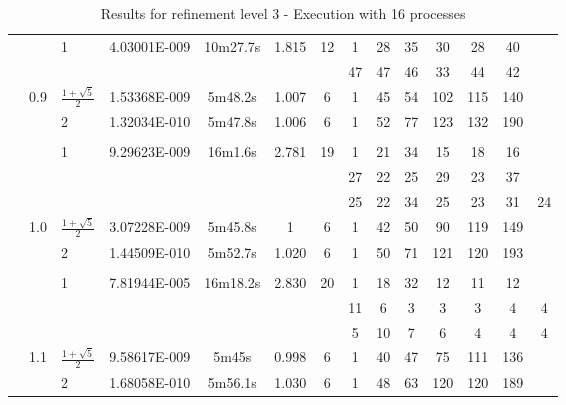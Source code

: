 \begin{sidewaystable}[p]
\begin{changemargin}{-2cm}{0cm}
\begin{tabular}{l c p{2cm} | c c c c c c c c c c c}
 \hline
 & & 1 & 4.03001E-009 & 10m27.7s & 1.815 & 12 & 1 & 28 & 35 & 30 & 28 & 40 \\
 & & & & & & & 47 & 47 & 46 & 33 & 44 & 42 \\
 & 0.9 & $ \frac{1 + \sqrt{5}}{2} $ & 
1.53368E-009 & 5m48.2s & 1.007 & 6 & 1 & 45 & 54 & 102 & 115 & 140 \\
 & & 2 & 1.32034E-010 & 5m47.8s & 1.006 & 6 & 1 & 52 & 77 & 123 & 132 & 190 \\
& & & & \\
 \hline
  & & 1 & 9.29623E-009 & 16m1.6s & 2.781 & 19 & 1 & 21 & 34 & 15 & 18 & 16 \\
  & & & & & & & 27 & 22 & 25 & 29 & 23 & 37 \\
  & & & & & & & 25 & 22 & 34 & 25 & 23 & 31 & 24 \\
& 1.0 & $ \frac{1 + \sqrt{5}}{2} $ &
3.07228E-009 & 5m45.8s & 1 & 6 & 1 & 42 & 50 & 90 & 119 & 149 \\
 & & 2 & 1.44509E-010 & 5m52.7s & 1.020 & 6 & 1 & 50 & 71 & 121 & 120 & 193 \\
& & & & \\
 \hline
  & & 1 & 7.81944E-005 & 16m18.2s & 2.830 & 20 & 1 & 18 & 32 & 12 & 11 & 12 \\
  & & & & & & & 11 & 6 & 3 & 3 & 3 & 4 & 4 \\
  & & & & & & & 5 & 10 & 7 & 6 & 4 & 4 & 4 \\
& 1.1 & $ \frac{1 + \sqrt{5}}{2} $ &
9.58617E-009 & 5m45s & 0.998 & 6 & 1 & 40 & 47 & 75 & 111 & 136 \\
 & & 2 & 1.68058E-010 & 5m56.1s & 1.030 & 6 & 1 & 48 & 63 & 120 & 120 & 189 \\ \hline 
\end{tabular}

\end{changemargin}

\caption{ Results for refinement level 3 - Execution with 16 processes }

\end{sidewaystable}




